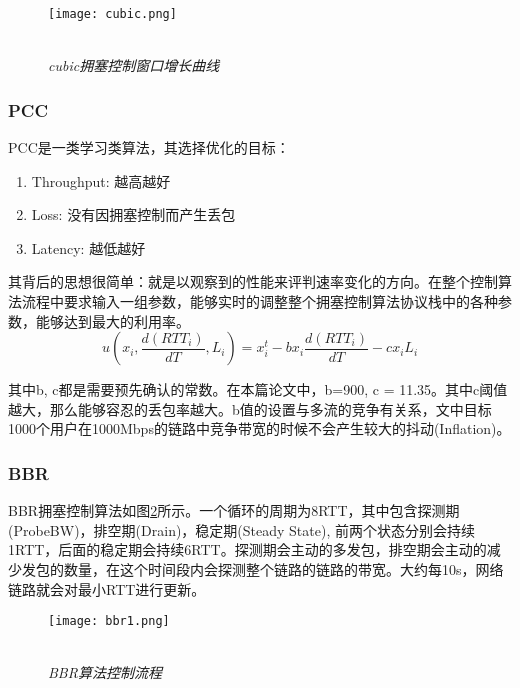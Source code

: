 \documentclass[a4paper, 12pt, UTF8]{ctexart}
\begin{document}
\begin{figure}[H]
	\centering \texttt{[image: cubic.png]}
	\\ \hspace*{\fill} \\
	\caption{\em cubic拥塞控制窗口增长曲线}
	\label{fig:cubics algorithm}
\end{figure}

\subsubsection{PCC}
\par PCC\cite{DongMZAGGS18}是一类学习类算法，其选择优化的目标：
\begin{enumerate}
	\item Throughput: 越高越好
	\item Loss: 没有因拥塞控制而产生丢包
	\item Latency: 越低越好
\end{enumerate}
\par 其背后的思想很简单：就是以观察到的性能来评判速率变化的方向。在整个控制算法流程中要求输入一组参数，能够实时的调整整个拥塞控制算法协议栈中的各种参数，能够达到最大的利用率。
$$
u(x_i, \frac{d(RTT_i)}{dT}, L_i) = x_i^t-bx_i\frac{d(RTT_i)}{dT}-cx_iL_i
$$
\par 其中b, c都是需要预先确认的常数。在本篇论文中，b=900, c = 11.35。其中c阈值越大，那么能够容忍的丢包率越大。b值的设置与多流的竞争有关系，文中目标1000个用户在1000Mbps的链路中竞争带宽的时候不会产生较大的抖动(Inflation)。

\subsubsection{BBR}
\par BBR\cite{DBLP:journals/queue/CardwellCGYJ16}拥塞控制算法如图\ref{fig:BBR process}所示。一个循环的周期为8RTT，其中包含探测期(ProbeBW)，排空期(Drain)，稳定期(Steady State), 前两个状态分别会持续1RTT，后面的稳定期会持续6RTT。探测期会主动的多发包，排空期会主动的减少发包的数量，在这个时间段内会探测整个链路的链路的带宽。大约每10s，网络链路就会对最小RTT进行更新。

\begin{figure}[H]
	\centering \texttt{[image: bbr1.png]}
	\\ \hspace*{\fill} \\
	\caption{\em BBR算法控制流程}
	\label{fig:BBR process}
\end{figure}
\end{document}
